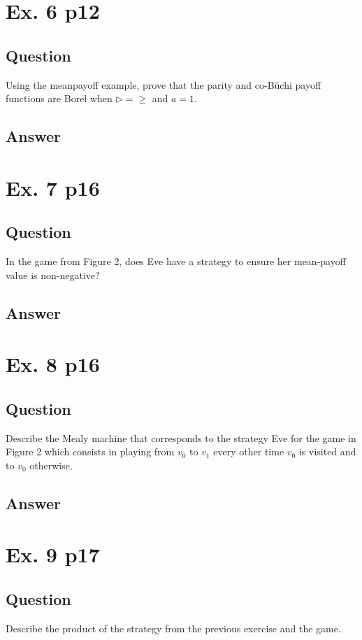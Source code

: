 \documentclass[12pt]{article}
\begin{document}
\section{Ex. 6 p12}
\subsection{Question}
Using the meanpayoff example, prove that the parity and co-Büchi payoff
 functions are Borel when $\triangleright = \geq$ and $a = 1$.

\subsection{Answer}


\section{Ex. 7 p16}
\subsection{Question}
In the game from Figure 2, does Eve have a strategy to ensure her mean-payoff value is non-negative?

\subsection{Answer}


\section{Ex. 8 p16}
\subsection{Question}
Describe the Mealy machine
that corresponds to the strategy Eve for
the game in Figure 2 which consists in
playing from $v_0$ to $v_1$ every other time
$v_0$ is visited and to $v_0$ otherwise.

\subsection{Answer}


\section{Ex. 9 p17}
\subsection{Question}
Describe the product of the strategy from the previous exercise and the game.
\end{document}
